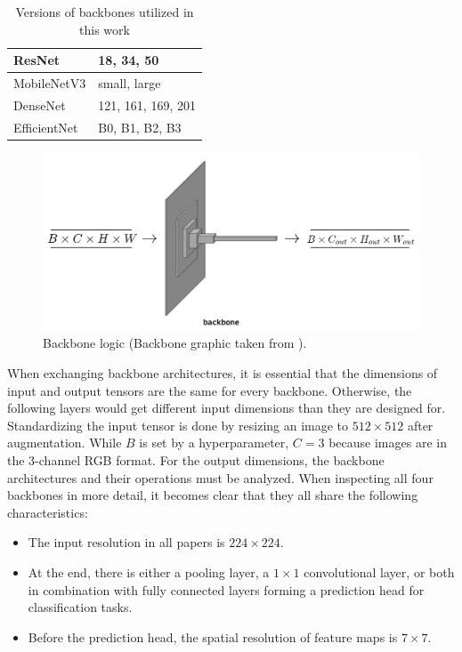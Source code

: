 \vspace{0.5cm}

\begin{table}[H]
    \centering
    \begin{tabular}{|l|l|}
        \hline
        ResNet & 18, 34, 50\\
        \hline
        MobileNetV3 & small, large\\
        \hline
        DenseNet & 121, 161, 169, 201\\
        \hline
        EfficientNet & B0, B1, B2, B3\\
        \hline
    \end{tabular}
    \caption{Versions of backbones utilized in this work}
    \label{tab:backboneVersions}
\end{table}

\begin{figure}[H]
    \centering
    \includegraphics[width=0.6\linewidth]{PICs/improvedModel/backbone_logic.jpg}
    \caption{Backbone logic (Backbone graphic taken from \cite{tepNet2024}).}
    \label{fig:backboneLogic}
\end{figure}

\noindent When exchanging backbone architectures, it is essential that the dimensions of input and output tensors are the same for every backbone.
Otherwise, the following layers would get different input dimensions than they are designed for.
Standardizing the input tensor is done by resizing an image to $512 \times 512$ after augmentation.
While $B$ is set by a hyperparameter, $C = 3$ because images are in the 3-channel \ac{RGB} format.
For the output dimensions, the backbone architectures and their operations must be analyzed.
When inspecting all four backbones in more detail, it becomes clear that they all share the following characteristics:

\begin{itemize}
    \item The input resolution in all papers is $224 \times 224$.
    \item At the end, there is either a pooling layer, a $1 \times 1$ convolutional layer, or both in combination with fully connected layers forming a prediction head for classification tasks.
    \item Before the prediction head, the spatial resolution of feature maps is $7 \times 7$.
\end{itemize}

